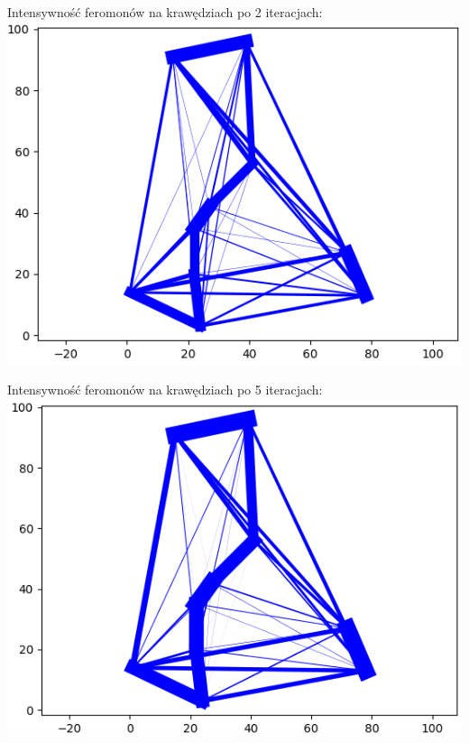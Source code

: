 \documentclass[11pt]{article}
\begin{document}
Intensywność feromonów na krawędziach po 2 iteracjach:\\
\includegraphics[scale=0.5]{images/fer2.png}


Intensywność feromonów na krawędziach po 5 iteracjach:\\
\includegraphics[scale=0.5]{images/fer3.png}
\end{document}
